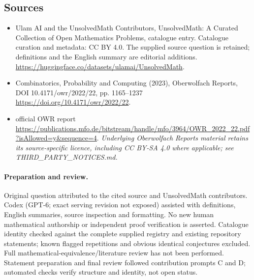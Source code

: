 \documentclass[11pt]{article}
\begin{document}
\subsection{Sources}
\begin{itemize}
\item[\hypertarget{source:statement:1}{S1}] Ulam AI and the UnsolvedMath Contributors, UnsolvedMath: A Curated Collection of Open Mathematics Problems, catalogue entry. Catalogue curation and metadata: CC BY 4.0. The supplied source question is retained; definitions and the English summary are editorial additions.
\url{https://huggingface.co/datasets/ulamai/UnsolvedMath}.
\item[\hypertarget{source:statement:2}{S2}] Combinatorics, Probability and Computing (2023), Oberwolfach Reports, DOI 10.4171/owr/2022/22, pp. 1165--1237
\url{https://doi.org/10.4171/owr/2022/22}.
\item[\hypertarget{source:statement:3}{S3}] official OWR report
\url{https://publications.mfo.de/bitstream/handle/mfo/3964/OWR_2022_22.pdf?isAllowed=y&sequence=4}.
\textit{Underlying Oberwolfach Reports material retains its source-specific licence, including CC BY-SA 4.0 where applicable; see THIRD\_PARTY\_NOTICES.md.}
\end{itemize}
\paragraph{Preparation and review.}
Original question attributed to the cited source and UnsolvedMath contributors. Codex (GPT-6; exact serving revision not exposed) assisted with definitions, English summaries, source inspection and formatting. No new human mathematical authorship or independent proof verification is asserted. Catalogue identity checked against the complete supplied registry and existing repository statements; known flagged repetitions and obvious identical conjectures excluded. Full mathematical-equivalence/literature review has not been performed. Statement preparation and final review followed contribution prompts C and D; automated checks verify structure and identity, not open status.
\label{end:statement}
\end{document}
